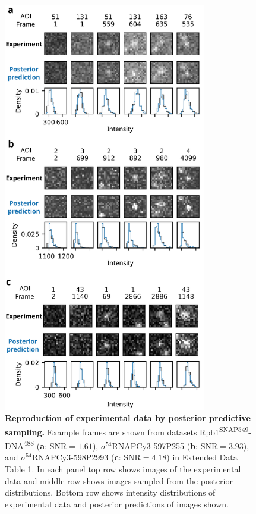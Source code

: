 \begin{figure}[h]
\centering
\includegraphics[width=89mm]{figures/figure4/figure4.png}
\caption{\textbf{Reproduction of experimental data by posterior predictive sampling.} Example frames are shown from datasets Rpb1\textsuperscript{SNAP549}-DNA\textsuperscript{488} (\textbf{a}: $\mathrm{SNR}=1.61$), $\sigma^{54}$RNAPCy3-597P255 (\textbf{b}: $\mathrm{SNR}=3.93$), and $\sigma^{54}$RNAPCy3-598P2993 (\textbf{c}: $\mathrm{SNR}=4.18$) in Extended Data Table 1. In each panel top row shows images of the experimental data and middle row shows images sampled from the posterior distributions. Bottom row shows intensity distributions of experimental data and posterior predictions of images shown. }
\label{fig:posterior_samples}
\end{figure}

